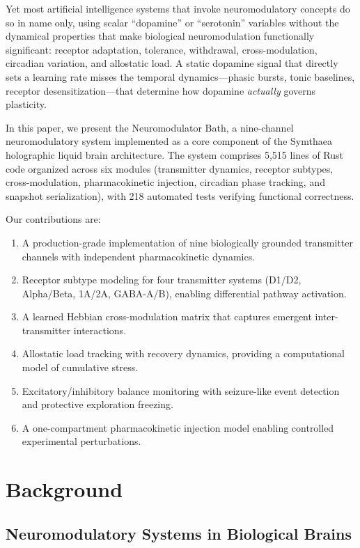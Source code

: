 \documentclass[11pt,a4paper]{article}
\begin{document}
Yet most artificial intelligence systems that invoke neuromodulatory concepts do so in name only, using scalar ``dopamine'' or ``serotonin'' variables without the dynamical properties that make biological neuromodulation functionally significant: receptor adaptation, tolerance, withdrawal, cross-modulation, circadian variation, and allostatic load. A static dopamine signal that directly sets a learning rate misses the temporal dynamics---phasic bursts, tonic baselines, receptor desensitization---that determine how dopamine \emph{actually} governs plasticity.

In this paper, we present the Neuromodulator Bath, a nine-channel neuromodulatory system implemented as a core component of the Symthaea holographic liquid brain architecture. The system comprises 5,515 lines of Rust code organized across six modules (transmitter dynamics, receptor subtypes, cross-modulation, pharmacokinetic injection, circadian phase tracking, and snapshot serialization), with 218 automated tests verifying functional correctness.

Our contributions are:

\begin{enumerate}
  \item A production-grade implementation of nine biologically grounded transmitter channels with independent pharmacokinetic dynamics.
  \item Receptor subtype modeling for four transmitter systems (D1/D2, Alpha/Beta, 1A/2A, GABA-A/B), enabling differential pathway activation.
  \item A learned Hebbian cross-modulation matrix that captures emergent inter-transmitter interactions.
  \item Allostatic load tracking with recovery dynamics, providing a computational model of cumulative stress.
  \item Excitatory/inhibitory balance monitoring with seizure-like event detection and protective exploration freezing.
  \item A one-compartment pharmacokinetic injection model enabling controlled experimental perturbations.
\end{enumerate}

\section{Background}

\subsection{Neuromodulatory Systems in Biological Brains}
\end{document}
